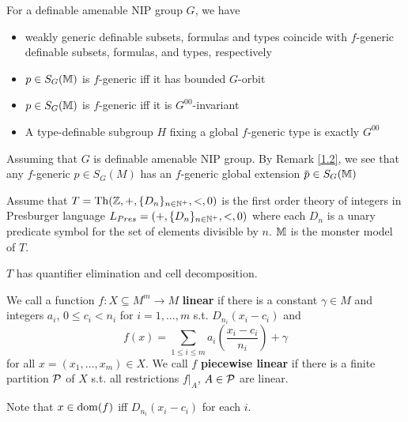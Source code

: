 \documentclass[11pt]{article}
\begin{document}
\begin{fact}[]
\label{fact1.4}
For a definable amenable NIP group \(G\), we have
\begin{itemize}
\item weakly generic definable subsets, formulas and types coincide with \(f\)-generic definable
subsets, formulas, and types, respectively
\item \(p\in S_G(\mathbb{M})\) is \(f\)-generic iff it has bounded \(G\)-orbit
\item \(p\in S_G(\mathbb{M})\) is \(f\)-generic iff it is \(G^{00}\)-invariant
\item A type-definable subgroup \(H\) fixing a global \(f\)-generic type is exactly \(G^{00}\)
\end{itemize}
\end{fact}

\begin{remark}
\label{1.5}
Assuming that \(G\) is definable amenable NIP group. By Remark \ref{1.2}, we see that
any \(f\)-generic \(p\in S_G(M)\) has an \(f\)-generic global extension \(\barp\in S_G(\M)\)
\end{remark}

Assume that \(T=\operatorname{Th}(\mathbb{Z},+,\{D_n\}_{n\in\mathbb{N}^+},<,0)\) is the first order theory of integers in Presburger
language \(L_{Pres}=(+,\{D_n\}_{n\in\mathbb{N}^+},<,0)\) where each \(D_n\) is a unary predicate symbol
for the set of elements divisible by \(n\). \(\mathbb{M}\) is the monster model of \(T\).

\(T\) has quantifier elimination and cell decomposition.

\begin{definition}[]
We call a function \(f:X\subseteq M^m\to M\) \textbf{linear} if there is a constant \(\gamma\in M\) and
integers \(a_i\), \(0\le c_i<n_i\) for \(i=1,\dots,m\) s.t. \(D_{n_i}(x_i-c_i)\) and
\begin{equation*}
f(x)=\sum_{1\le i\le m}a_i(\frac{x_i-c_i}{n_i})+\gamma
\end{equation*}
for all \(x=(x_1,\dots,x_m)\in X\). We call \(f\) \textbf{piecewise linear} if there is a finite partition \(\mathcal{P}\)
of \(X\) s.t. all restrictions \(f|_A\), \(A\in\mathcal{P}\) are linear.
\end{definition}

Note that \(x\in\operatorname{dom}(f)\) iff \(D_{n_i}(x_i-c_i)\) for each \(i\).
\end{document}
